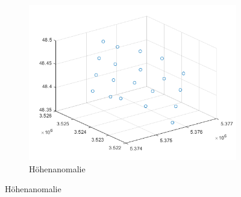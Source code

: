 \begin{figure}[ht]\centering
	\begin{subfigure}{.8\textwidth}
		\centering
		\includegraphics[width=.8\linewidth]{Images/Hoeheanomaliepunkt}  
		\caption{Höhenanomalie}
		\label{fig:sub-first}
	\end{subfigure}
\end{figure}

\newpage
